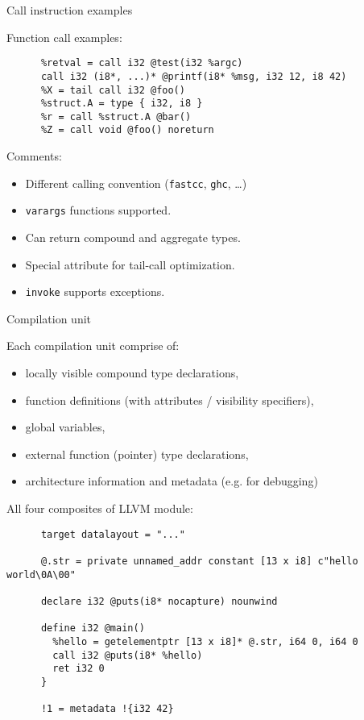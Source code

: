 \documentclass[8pt]{beamer}
\begin{document}
\begin{frame}[fragile]{Call instruction examples}
  \begin{exampleblock}{Function call examples:}
    \begin{verbatim}
      %retval = call i32 @test(i32 %argc)
      call i32 (i8*, ...)* @printf(i8* %msg, i32 12, i8 42)
      %X = tail call i32 @foo()
      %struct.A = type { i32, i8 }
      %r = call %struct.A @bar()
      %Z = call void @foo() noreturn
    \end{verbatim}
  \end{exampleblock}

  \begin{block}{Comments:}
    \begin{itemize}
      \item Different calling convention (\verb+fastcc+, \verb+ghc+, \ldots)
      \item \verb+varargs+ functions supported.
      \item Can return compound and aggregate types.
      \item Special attribute for tail-call optimization.
      \item \verb+invoke+ supports exceptions.
    \end{itemize}
  \end{block}
\end{frame}

\begin{frame}[fragile]{Compilation unit}
  \begin{block}{Each compilation unit comprise of:}
    \begin{itemize}
      \item locally visible compound type declarations,
      \item function definitions (with attributes / visibility specifiers),
      \item global variables,
      \item external function (pointer) type declarations,
      \item architecture information and metadata (e.g. for debugging)
    \end{itemize}
  \end{block}

  \begin{exampleblock}{All four composites of LLVM module:}
    \begin{verbatim}
      target datalayout = "..."

      @.str = private unnamed_addr constant [13 x i8] c"hello world\0A\00"

      declare i32 @puts(i8* nocapture) nounwind

      define i32 @main() 
        %hello = getelementptr [13 x i8]* @.str, i64 0, i64 0
        call i32 @puts(i8* %hello)
        ret i32 0
      }

      !1 = metadata !{i32 42}
    \end{verbatim}
  \end{exampleblock}
\end{frame}
\end{document}
